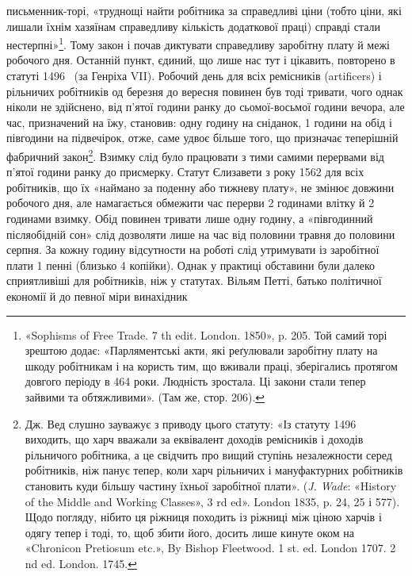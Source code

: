 \parcont{}  %
письменник-торі, «труднощі найти робітника за справедливі
ціни (тобто ціни, які лишали їхнім хазяїнам справедливу кількість
додаткової праці) справді стали нестерпні»\footnote{
«Sophisms of Free Trade. 7 th edit. London. 1850», p. 205. Той
самий торі зрештою додає: «Парляментські акти, які реґулювали заробітну
плату на шкоду робітникам і на користь тим, що вживали праці,
зберігались протягом довгого періоду в 464 роки. Людність зростала.
Ці закони стали тепер зайвими та обтяжливими». (Там же, стор. 206).
}. Тому закон і
почав диктувати справедливу заробітну плату й межі робочого
дня. Останній пункт, єдиний, що лише нас тут і цікавить, повторено
в статуті 1496~ (за Генріха VII). Робочий день для всіх
ремісників (artificers) і рільничих робітників од березня до вересня
повинен був тоді тривати, чого однак ніколи не здійснено,
від п’ятої години ранку до сьомої-восьмої години вечора,
але час, призначений на їжу, становив: одну годину на сніданок,
1 години на обід і півгодини на підвечірок, отже, саме
удвоє більше того, що призначає теперішній фабричний закон\footnote{
Дж. Вед слушно зауважує з приводу цього статуту: «Із статуту
1496~ виходить, що харч вважали за еквівалент  доходів ремісників
і  доходів рільничого робітника, а це свідчить про вищий ступінь незалежности
серед робітників, ніж панує тепер, коли харч рільничих і мануфактурних
робітників становить куди більшу частину їхньої заробітної
плати». (\emph{J. Wade}: «History of the Middle and Working Classes», 3 rd
ed». London 1835, p. 24, 25 і 577). Щодо погляду, нібито ця ріжниця
походить із ріжниці між ціною харчів і одягу тепер і тоді, то, щоб збити
його, досить лише кинуте оком на «Chronicon Pretiosum etc.», By Bishop
Fleetwood. 1 st. ed. London 1707. 2 nd ed. London. 1745.
}. Взимку слід було працювати з тими самими перервами від п’ятої
години ранку до присмерку. Статут Єлизавети з року 1562 для
всіх робітників, що їх «наймано за поденну або тижневу плату»,
не змінює довжини робочого дня, але намагається обмежити час
перерви 2 годинами влітку й 2 годинами взимку. Обід повинен
тривати лише одну годину, а «півгодинний післяобідній сон» слід
дозволяти лише на час від половини травня до половини серпня.
За кожну годину відсутности на роботі слід утримувати із заробітної
плати 1 пенні (близько 4 копійки). Однак у практиці обставини
були далеко сприятливіші для робітників, ніж у статутах.
Вільям Петті, батько політичної економії й до певної міри винахідник
